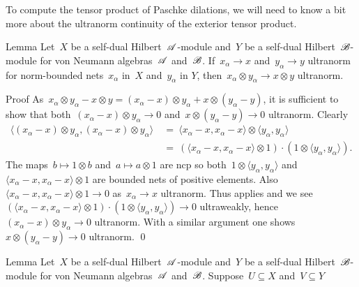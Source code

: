 \begin{parsec}%
\begin{point}%
To compute the tensor product of Paschke dilations,
    we will need to know a bit more about
    the ultranorm continuity of the exterior tensor product.
\end{point}
\begin{point}{Lemma}%
Let~$X$ be a self-dual Hilbert~$\mathscr{A}$-module
    and~$Y$ be a self-dual Hilbert~$\mathscr{B}$-module
    for von Neumann algebras~$\mathscr{A}$ and~$\mathscr{B}$.
If~$x_\alpha \to x$ and~$y_\alpha \to y$ ultranorm
    for norm-bounded nets~$x_\alpha$ in~$X$ and~$y_\alpha$ in $Y$,
    then~$x_\alpha \otimes y_\alpha \to x \otimes y$ ultranorm.
\begin{point}{Proof}%
As~$x_\alpha \otimes y_\alpha - x \otimes y
            = (x_\alpha -x )\otimes y_\alpha + x\otimes (y_\alpha - y)$,
            it is sufficient
    to show that both~$(x_\alpha -x) \otimes y_\alpha \to 0$
    and~$x\otimes (y_\alpha - y) \to 0$ ultranorm.
Clearly
\begin{align*}
    \langle (x_\alpha - x) \otimes y_\alpha,
        (x_\alpha - x) \otimes y_\alpha \rangle
    & \ = \ 
    \langle x_\alpha - x , x_\alpha - x \rangle\otimes 
    \langle y_\alpha ,y_\alpha \rangle \\
    & \ = \ 
    (\langle x_\alpha - x , x_\alpha - x \rangle\otimes 1) \cdot (1 \otimes 
    \langle y_\alpha ,y_\alpha \rangle ).
\end{align*}
The maps~$b \mapsto 1 \otimes b$ and~$a \mapsto a \otimes 1$
    are ncp %
    so both~$1 \otimes \langle y_\alpha, y_\alpha \rangle$
    and~$\langle x_\alpha - x , x_\alpha - x \rangle\otimes 1$
    are bounded nets of positive elements.
    Also~$\langle x_\alpha - x , x_\alpha - x \rangle\otimes 1 \to 0$
        as~$x_\alpha \to x$ ultranorm.
Thus \sref{vanishing-effects} applies and we see
    $(\langle x_\alpha - x , x_\alpha - x \rangle\otimes 1) \cdot (1 \otimes 
    \langle y_\alpha ,y_\alpha \rangle ) \to 0$ ultraweakly,
    hence~$(x_\alpha - x) \otimes y_\alpha \to 0$ ultranorm.
With a similar argument
    one shows~$x\otimes (y_\alpha - y) \to 0$ ultranorm. \qed
\end{point}
\end{point}
\begin{point}{Lemma}%
Let~$X$ be a self-dual Hilbert~$\mathscr{A}$-module
    and~$Y$ be a self-dual Hilbert~$\mathscr{B}$-module
    for von Neumann algebras~$\mathscr{A}$ and~$\mathscr{B}$.
Suppose~$U \subseteq X$ and~$V \subseteq Y$

\end{point}
\end{parsec}
